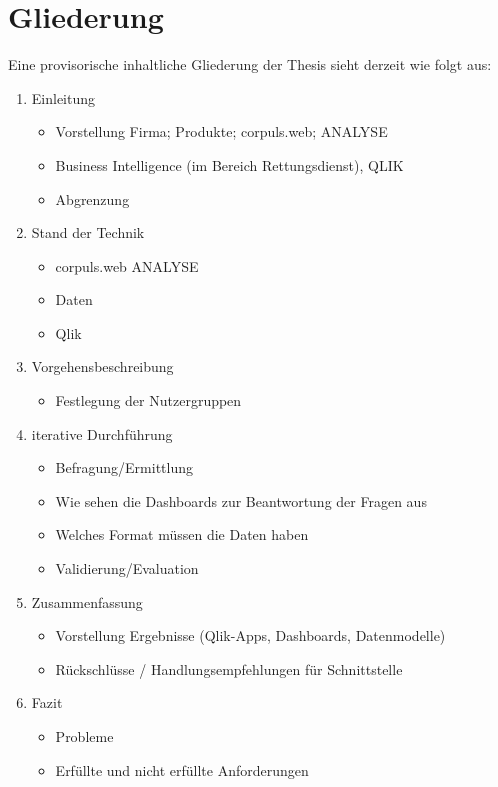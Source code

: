 \documentclass[12pt]{article}
\begin{document}
\section{Gliederung}\label{gliederung}
Eine provisorische inhaltliche Gliederung der Thesis sieht derzeit wie folgt
aus: 
\begin{enumerate}
  \item Einleitung
  \begin{itemize}
      \item Vorstellung Firma; Produkte; corpuls.web; ANALYSE
      \item Business Intelligence (im Bereich Rettungsdienst), QLIK  
      \item Abgrenzung      
  \end{itemize}
  \item Stand der Technik
  \begin{itemize}
      \item corpuls.web ANALYSE
      \item Daten
      \item Qlik
  \end{itemize}        
   \item Vorgehensbeschreibung
   \begin{itemize}
      \item Festlegung der Nutzergruppen
   \end{itemize}
   \item iterative Durchführung
   \begin{itemize}
      \item Befragung/Ermittlung
      \item Wie sehen die Dashboards zur Beantwortung der Fragen aus
      \item Welches Format müssen die Daten haben
      \item Validierung/Evaluation
  \end{itemize}
    \item Zusammenfassung
    \begin{itemize}
      \item  Vorstellung Ergebnisse (Qlik-Apps, Dashboards, Datenmodelle)
      \item Rückschlüsse / Handlungsempfehlungen für Schnittstelle        
  \end{itemize}
    \item Fazit
    \begin{itemize}
      \item Probleme
      \item Erfüllte und nicht erfüllte Anforderungen
  \end{itemize}
\end{enumerate}





\end{document}
